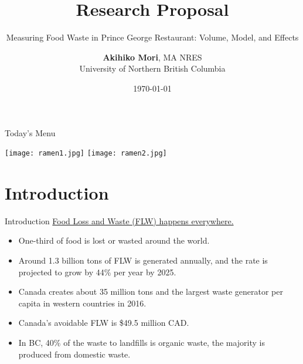 \documentclass{beamer}\usepackage[]{graphicx}\usepackage[]{xcolor}
\title{Research Proposal}
\subtitle{Measuring Food Waste in Prince George Restaurant: Volume, Model, and Effects}
\author{\textbf{Akihiko Mori}, MA NRES \texorpdfstring{\\University of Northern British Columbia}
\texorpdfstring{\\Supervisor: Dr. Deo Balbinder}{}}
\date{\today}
\begin{document}
\begin{frame}
    \maketitle
\end{frame}

\begin{frame}{Today's Menu}
    \begin{minipage}[t][0.6\textheight]{0.6\textwidth}
        \vspace{0pt} 
        \tableofcontents[hideallsubsections]
    \end{minipage}
    \begin{minipage}[t]{0.35\textwidth} 
        \vspace{3pt}  
        \texttt{[image: ramen1.jpg]}
        \texttt{[image: ramen2.jpg]}
    \end{minipage}
\end{frame}

\section{Introduction}
\begin{frame}{Introduction}
    \underline{Food Loss and Waste (FLW) happens everywhere.}
    \begin{itemize}
        \item One-third of food is lost or wasted around the world\cite{Gustavsson2011-em}.
        \item Around 1.3 billion tons of FLW is generated annually, and the rate is projected to grow by 44\% per year by 2025\cite{Blakeney2019-jk}.
    \end{itemize}
    \begin{itemize}
        \item Canada creates about 35 million tons and the largest waste generator per capita in western countries in 2016\cite{Nzwc2016-jl}.
        \item Canada's avoidable FLW is \$49.5 million CAD\cite{Gooch2019-gd}.
    \end{itemize}
    \begin{itemize}
        \item In BC, 40\% of the waste to landfills is organic waste, the majority is produced from domestic waste\cite{BCwaste}.
    \end{itemize}
\end{frame}
\end{document}
